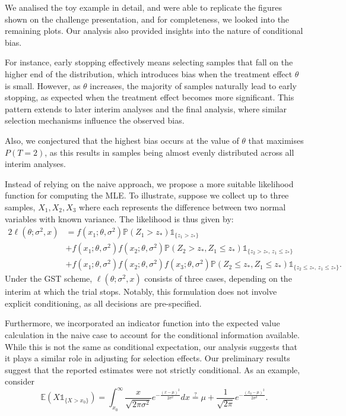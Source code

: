 \documentclass[12pt,a4paper]{article}
\newcommand{\E}{\mathbb{E}}
\begin{document}

We analised the toy example in detail, and were able to replicate the figures shown on the challenge presentation, and for completeness, we looked into the remaining plots. Our analysis also provided insights into the nature of conditional bias. 

For instance, early stopping effectively means selecting samples that fall on the higher end of the distribution, which introduces bias when the treatment effect $\theta$ is small. However, as $\theta$ increases, the majority of samples naturally lead to early stopping, as expected when the treatment effect becomes more significant. This pattern extends to later interim analyses and the final analysis, where similar selection mechanisms influence the observed bias. 

Also, we conjectured that the highest bias occurs at the value of $\theta $ that maximises $P(T=2)$, as this results in samples being almost evenly distributed across all interim analyses. 

Instead of relying on the naive approach, we propose a more suitable likelihood function for computing the MLE. To illustrate, suppose we collect up to three samples, $X_1, X_2, X_3$ where each represents the difference between two normal variables with known variance. The likelihood is thus given by:
\begin{alignat*}{2}
	\ell(\theta; \sigma^2, x) &= f(x_1; \theta , \sigma^2)\mathbb{P}(Z_1 > z_*) \mathds{1}_{\{z_1 > z_*\}}\\
	& + f(x_1; \theta , \sigma^2)f(x_2; \theta , \sigma^2)\mathbb{P}(Z_2 > z_*, Z_1 \leq z_*) \mathds{1}_{\{z_2 > z_*, \,z_1 \leq z_*\}}\\
	& + f(x_1; \theta , \sigma^2)f(x_2; \theta , \sigma^2)f(x_3; \theta , \sigma^2)\mathbb{P}(Z_2 \leq z_*, Z_1 \leq z_*)\mathds{1}_{\{z_2 \leq z_*, \,z_1 \leq z_*\}}.
\end{alignat*}
Under the GST scheme, $\ell(\theta; \sigma^2, x)$ consists of three cases, depending on the interim at which the trial stops. Notably, this formulation does not involve explicit conditioning, as all decisions are pre-specified. 

Furthermore, we incorporated an indicator function into the expected value calculation in the naive case to account for the conditional information available. While this is not the same as conditional expectation, our analysis suggests that it plays a similar role in adjusting for selection effects. Our preliminary results suggest that the reported estimates were not strictly conditional. As an example, consider
$$\E(X\mathds{1}_{\{X > x_0\}}) = \int_{x_0}^\infty \frac{x}{\sqrt{2\pi \sigma^2}}e^{-\frac{(x-\mu)^2}{2\sigma^2}}dx \stackrel{\text{?}}{=} \mu +  \frac{1}{\sqrt{2\pi }}e^{-\frac{(x_0-\mu)^2}{2\sigma^2}}.$$
\end{document}

